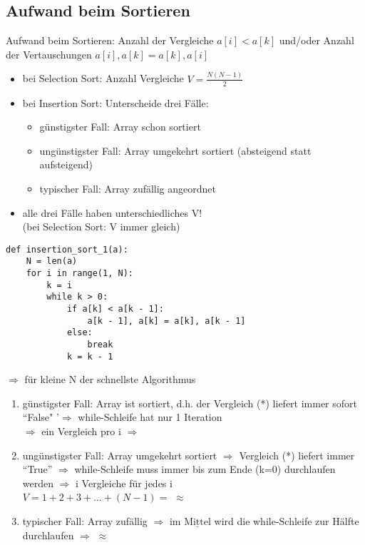     \subsection{Aufwand beim Sortieren}
    Aufwand beim Sortieren: Anzahl der Vergleiche $a[i] < a[k]$ und/oder Anzahl der Vertauschungen $a[i],a[k] = a[k], a[i]$

    \begin{itemize}
        \item bei Selection Sort: Anzahl Vergleiche $V = \frac{N(N-1)}{2}$
        \item bei Insertion Sort: Unterscheide drei Fälle:
        \begin{itemize}
            \item günstigster Fall: Array schon sortiert
            \item ungünstigster Fall: Array umgekehrt sortiert (absteigend statt aufsteigend)
            \item typischer Fall: Array zufällig angeordnet
        \end{itemize}
        \item alle drei Fälle haben unterschiedliches V! \\
        (bei Selection Sort: V immer gleich)

    \end{itemize}

    \begin{verbatim}
def insertion_sort_1(a):
    N = len(a)
    for i in range(1, N):
        k = i
        while k > 0:
            if a[k] < a[k - 1]:
                a[k - 1], a[k] = a[k], a[k - 1]
            else:
                break
            k = k - 1
    \end{verbatim}

    $\Rightarrow$ für kleine N der schnellste Algorithmus \\
    \vspace*{-5mm}
    \begin{enumerate}
        \item günstigster Fall: Array ist sortiert, d.h. der Vergleich (*) liefert immer sofort ``False" '$\Rightarrow$ while-Schleife hat nur 1 Iteration \\
        $\Rightarrow$ ein Vergleich pro i $\Rightarrow$
        \item ungünstigster Fall: Array umgekehrt sortiert $\Rightarrow$ Vergleich (*) liefert immer ``True'' $\Rightarrow$ while-Schleife muss immer bis zum Ende (k=0) durchlaufen werden $\Rightarrow$ i Vergleiche für jedes i \\
        $V=1+2+3+...+(N-1)=$  $\approx$ 
        \item typischer Fall: Array zufällig $\Rightarrow$ im $\underline{\text{Mittel}}$ wird die while-Schleife zur Hälfte durchlaufen $\Rightarrow$  $\approx$ 
    \end{enumerate}


